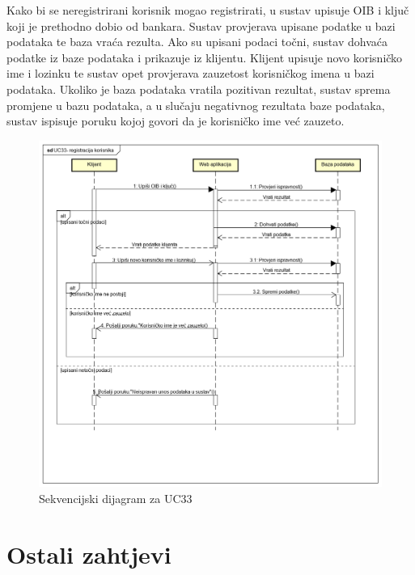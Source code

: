 			
			
			Kako bi se neregistrirani korisnik mogao registrirati, u sustav upisuje OIB i ključ koji je prethodno dobio od bankara. Sustav provjerava upisane podatke u bazi podataka te baza vraća rezulta. Ako su upisani podaci točni, sustav dohvaća podatke iz baze podataka i prikazuje iz klijentu. Klijent upisuje novo korisničko ime i lozinku te sustav opet provjerava zauzetost korisničkog imena u bazi podataka. Ukoliko je baza podataka vratila pozitivan rezultat, sustav sprema promjene u bazu podataka, a u slučaju negativnog rezultata baze podataka, sustav ispisuje poruku kojoj govori da je korisničko ime već zauzeto.
			\eject
			
			\begin{figure}[H]
				\includegraphics[scale=0.60]{slike/UC33.PNG}
				\centering
				\caption{Sekvencijski dijagram za UC33}
				\label{fig:uc33}
			\end{figure}
			\eject
			
	
		\section{Ostali zahtjevi}
			 
